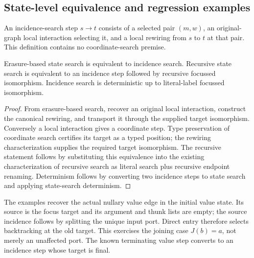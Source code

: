 \subsection{State-level equivalence and regression examples}
\begin{definition}\label{term:incidence-search}
An incidence-search step $s\to t$ consists of a selected pair $(m,w)$, an
original-graph local interaction selecting it, and a local rewiring from $s$
to $t$ at that pair. This definition contains no coordinate-search premise.
\end{definition}
\begin{theorem}
Erasure-based state search is equivalent to incidence search. Recursive state
search is equivalent to an incidence step followed by recursive focussed
isomorphism. Incidence search is deterministic up to literal-label focussed
isomorphism.
\end{theorem}
\begin{proof}
From erasure-based search, recover an original local interaction, construct the
canonical rewiring, and transport it through the supplied target isomorphism.
Conversely a local interaction gives a coordinate step. Type preservation of
coordinate search certifies its target as a typed position; the rewiring
characterization supplies the required target isomorphism. The recursive
statement follows by substituting this equivalence into the existing
characterization of recursive search as literal search plus recursive endpoint
renaming. Determinism follows by converting two incidence steps to state
search and applying state-search determinism.
\end{proof}

The examples recover the actual nullary value edge in the initial value state.
Its source is the focus target and its argument and thunk lists are empty;
the source incidence follows by splitting the unique input port. Direct entry
therefore selects backtracking at the old target. This exercises the joining
case $J(b)=a$, not merely an unaffected port. The known terminating value step
converts to an incidence step whose target is final.

